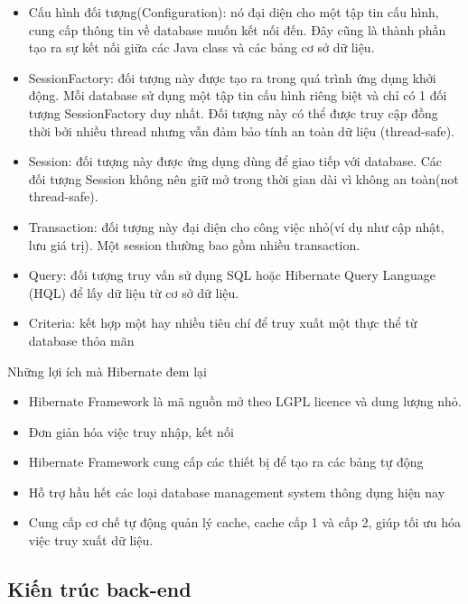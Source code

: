 \documentclass[11pt,a4paper,oneside]{book}
\begin{document}
\begin{itemize}[topsep=1mm,itemsep=-0.5mm]
\item Cấu hình đối tượng(Configuration): nó đại diện cho một tập tin cấu hình, cung cấp thông tin về database muốn kết nối đến. Đây cũng là thành phần tạo ra sự kết nối giữa các Java class và các bảng cơ sở dữ liệu.
\item SessionFactory: đối tượng này được tạo ra trong quá trình ứng dụng khởi động. Mỗi database sử dụng một tập tin cấu hình riêng biệt và chỉ có 1 đối tượng SessionFactory duy nhất. Đối tượng này có thể được truy cập đồng thời bởi nhiều thread nhưng vẫn đảm bảo tính an toàn dữ liệu (thread-safe).
\item Session: đối tượng này được ứng dụng dùng để giao tiếp với database. Các đối tượng Session không nên giữ mở trong thời gian dài vì không an toàn(not thread-safe).
\item Transaction: đối tượng này đại diện cho công việc nhỏ(ví dụ như cập nhật, lưu giá trị). Một session thường bao gồm nhiều transaction.
\item Query: đối tượng truy vấn sử dụng SQL hoặc Hibernate Query Language (HQL) để lấy dữ liệu từ cơ sở dữ liệu.
\item Criteria: kết hợp một hay nhiều tiêu chí để truy xuất một thực thể từ database thỏa mãn
\vspace{1mm}
\end{itemize}

Những lợi ích mà Hibernate đem lại

\begin{itemize}[topsep=1mm,itemsep=-0.5mm]
\item Hibernate Framework là mã nguồn mở theo LGPL licence và dung lượng nhỏ.
\item Đơn giản hóa việc truy nhập, kết nối
\item Hibernate Framework cung cấp các thiết bị để tạo ra các bảng tự động
\item Hỗ trợ hầu hết các loại database management system thông dụng hiện nay
\item Cung cấp cơ chế tự động quản lý cache, cache cấp 1 và cấp 2, giúp tối ưu hóa việc truy xuất dữ liệu.
\vspace{1mm}
\end{itemize}

\subsection{Kiến trúc back-end}
\end{document}
